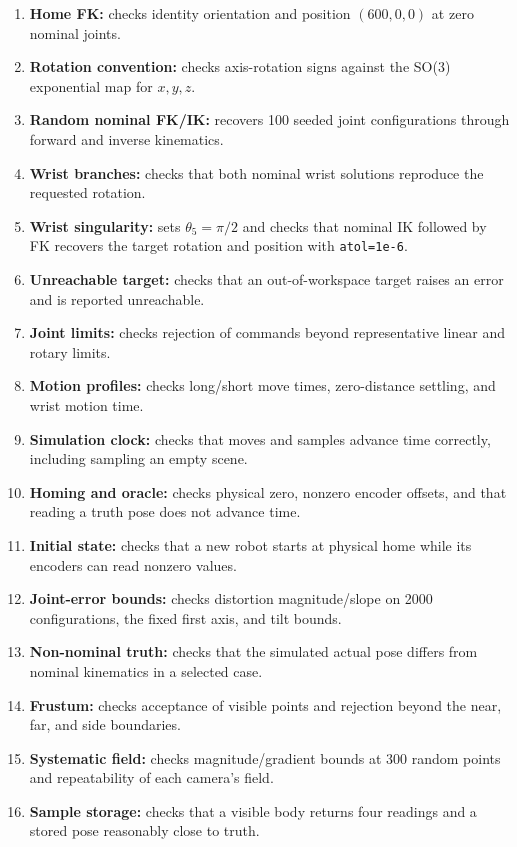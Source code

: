\documentclass[11pt]{article}
\begin{document}
\begin{enumerate}
\setlength{\itemsep}{0pt}
\item \textbf{Home FK:} checks identity orientation and position $(600,0,0)$ at zero nominal joints.
\item \textbf{Rotation convention:} checks axis-rotation signs against the SO(3) exponential map for $x,y,z$.
\item \textbf{Random nominal FK/IK:} recovers 100 seeded joint configurations through forward and inverse kinematics.
\item \textbf{Wrist branches:} checks that both nominal wrist solutions reproduce the requested rotation.
\item \textbf{Wrist singularity:} sets $\theta_5=\pi/2$ and checks that nominal IK followed by FK recovers the target rotation and position with \texttt{atol=1e-6}.
\item \textbf{Unreachable target:} checks that an out-of-workspace target raises an error and is reported unreachable.
\item \textbf{Joint limits:} checks rejection of commands beyond representative linear and rotary limits.
\item \textbf{Motion profiles:} checks long/short move times, zero-distance settling, and wrist motion time.
\item \textbf{Simulation clock:} checks that moves and samples advance time correctly, including sampling an empty scene.
\item \textbf{Homing and oracle:} checks physical zero, nonzero encoder offsets, and that reading a truth pose does not advance time.
\item \textbf{Initial state:} checks that a new robot starts at physical home while its encoders can read nonzero values.
\item \textbf{Joint-error bounds:} checks distortion magnitude/slope on 2000 configurations, the fixed first axis, and tilt bounds.
\item \textbf{Non-nominal truth:} checks that the simulated actual pose differs from nominal kinematics in a selected case.
\item \textbf{Frustum:} checks acceptance of visible points and rejection beyond the near, far, and side boundaries.
\item \textbf{Systematic field:} checks magnitude/gradient bounds at 300 random points and repeatability of each camera's field.
\item \textbf{Sample storage:} checks that a visible body returns four readings and a stored pose reasonably close to truth.

\end{enumerate}
\end{document}
